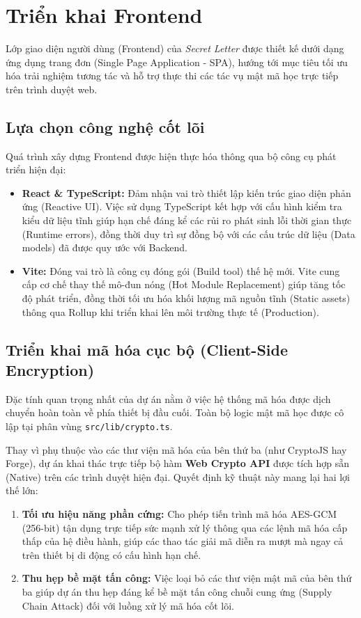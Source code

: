 \section{Triển khai Frontend}

Lớp giao diện người dùng (Frontend) của \textit{Secret Letter} được thiết kế dưới dạng ứng dụng trang đơn (Single Page Application - SPA), hướng tới mục tiêu tối ưu hóa trải nghiệm tương tác và hỗ trợ thực thi các tác vụ mật mã học trực tiếp trên trình duyệt web.

\subsection{Lựa chọn công nghệ cốt lõi}

Quá trình xây dựng Frontend được hiện thực hóa thông qua bộ công cụ phát triển hiện đại:
\begin{itemize}
    \item \textbf{React \& TypeScript:} Đảm nhận vai trò thiết lập kiến trúc giao diện phản ứng (Reactive UI). Việc sử dụng TypeScript kết hợp với cấu hình kiểm tra kiểu dữ liệu tĩnh giúp hạn chế đáng kể các rủi ro phát sinh lỗi thời gian thực (Runtime errors), đồng thời duy trì sự đồng bộ với các cấu trúc dữ liệu (Data models) đã được quy ước với Backend.
    \item \textbf{Vite:} Đóng vai trò là công cụ đóng gói (Build tool) thế hệ mới. Vite cung cấp cơ chế thay thế mô-đun nóng (Hot Module Replacement) giúp tăng tốc độ phát triển, đồng thời tối ưu hóa khối lượng mã nguồn tĩnh (Static assets) thông qua Rollup khi triển khai lên môi trường thực tế (Production).
\end{itemize}

\subsection{Triển khai mã hóa cục bộ (Client-Side Encryption)}

Đặc tính quan trọng nhất của dự án nằm ở việc hệ thống mã hóa được dịch chuyển hoàn toàn về phía thiết bị đầu cuối. Toàn bộ logic mật mã học được cô lập tại phân vùng \texttt{src/lib/crypto.ts}.

Thay vì phụ thuộc vào các thư viện mã hóa của bên thứ ba (như CryptoJS hay Forge), dự án khai thác trực tiếp bộ hàm \textbf{Web Crypto API} được tích hợp sẵn (Native) trên các trình duyệt hiện đại. Quyết định kỹ thuật này mang lại hai lợi thế lớn:
\begin{enumerate}
    \item \textbf{Tối ưu hiệu năng phần cứng:} Cho phép tiến trình mã hóa AES-GCM (256-bit) tận dụng trực tiếp sức mạnh xử lý thông qua các lệnh mã hóa cấp thấp của hệ điều hành, giúp các thao tác giải mã diễn ra mượt mà ngay cả trên thiết bị di động có cấu hình hạn chế.
    \item \textbf{Thu hẹp bề mặt tấn công:} Việc loại bỏ các thư viện mật mã của bên thứ ba giúp dự án thu hẹp đáng kể bề mặt tấn công chuỗi cung ứng (Supply Chain Attack) đối với luồng xử lý mã hóa cốt lõi.
\end{enumerate}

